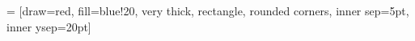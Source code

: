 \documentclass[10pt]{article}
\begin{document}
 = [draw=red, fill=blue!20, very thick,
    rectangle, rounded corners, inner sep=5pt, inner ysep=20pt]

\end{document}
